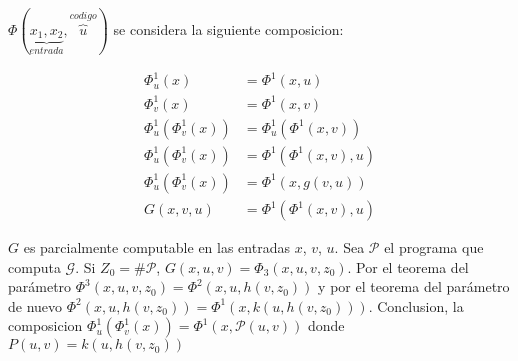 \begin{observation}
$\Phi(\underbrace{x_1, x_2}_{entrada}, \overbrace{u}^{codigo})$ se considera la siguiente composicion:

\begin{align*}
\Phi_{u}^{1}(x) 				&= \Phi^{1}(x, u)						\\
\Phi_{v}^{1}(x) 				&= \Phi^{1}(x, v)						\\
\Phi_{u}^{1}(\Phi_{v}^{1}(x)) 	&= \Phi_{u}^{1}(\Phi^{1}(x, v))			\\
\Phi_{u}^{1}(\Phi_{v}^{1}(x)) 	&= \Phi^{1}(\Phi^{1}(x, v), u)			\\
\Phi_{u}^{1}(\Phi_{v}^{1}(x)) 	&= \Phi^{1}(x, g(v, u))					\\
G(x, v, u)						&= \Phi^{1}(\Phi^{1}(x, v), u)
\end{align*}


$G$ es parcialmente computable en las entradas $x$, $v$, $u$. Sea $\mathcal{P}$ el programa que computa $\mathcal{G}$. Si $Z_0 = \# \mathcal{P}$, $G(x, u, v) = \Phi_{3}(x, u, v, z_0)$. Por el teorema del par\'ametro $\Phi^{3}(x, u, v, z_0) = \Phi^{2}(x, u, h(v, z_0))$ y por el teorema del par\'ametro de nuevo $\Phi^{2}(x, u, h(v, z_0)) = \Phi^{1}(x, k(u, h(v, z_0)))$. Conclusion, la composicion $\Phi^{1}_{u}(\Phi^{1}_{v}(x)) = \Phi^{1}(x, \mathcal{P}(u, v))$ donde $P(u, v) = k(u, h(v, z_0))$
\end{observation}

